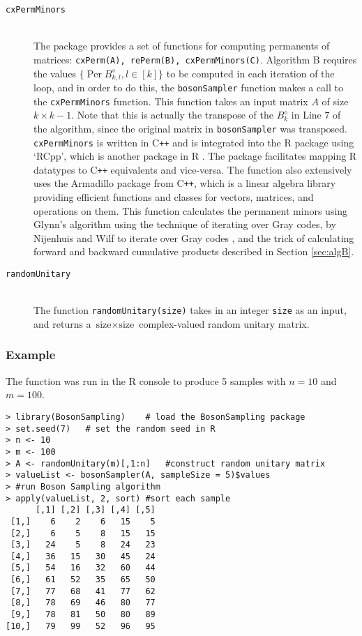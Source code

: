 \documentclass[11pt]{article}
\theoremstyle{theorem}
\theoremstyle{theorem}
\theoremstyle{remark}
\theoremstyle{note}
\theoremstyle{plain}
\theoremstyle{definition}
\DeclareMathOperator*{\Per}{\mathrm{Per}}
\begin{document}
\begin{description}
\item[\texttt{cxPermMinors}] \hfill \\ The package provides a set of functions for computing permanents of matrices: \texttt{cxPerm(A), rePerm(B), cxPermMinors(C)}. Algorithm B requires the values $\{ \Per B_{k, l}^{\diamond}, l \in [k] \}$ to be computed in each iteration of the loop, and in order to do this, the \texttt{bosonSampler} function makes a call to the \texttt{cxPermMinors} function. This function takes an input matrix $A$ of size $k \times k-1$. Note that this is actually the transpose of the $B_k^{\diamond}$ in Line 7 of the algorithm, since the original matrix in \texttt{bosonSampler} was transposed. \texttt{cxPermMinors} is written in C\texttt{++} and is integrated into the R package using `RCpp', which is another package in R \cite{rcpp}. The package facilitates  mapping R datatypes to C\texttt{++} equivalents and vice-versa. The function also extensively uses the Armadillo package from C\texttt{++}\cite{armadillo}, which is a linear algebra library providing efficient functions and classes for vectors, matrices, and operations on them. This function calculates the permanent minors using Glynn's algorithm \cite{glynn2010} using the technique of iterating over Gray codes, by Nijenhuis and Wilf\cite{Nijenhuis1978} to iterate over Gray codes , and the trick of calculating forward and backward cumulative products described in Section \ref{sec:algB}.
\item[\texttt{randomUnitary}] \hfill \\The function \texttt{randomUnitary(size)} takes in an integer \texttt{size} as an input, and returns a $\text{size} \times \text{size}$ complex-valued random unitary matrix.
\end{description}
\subsubsection*{Example}
The function was run in the R console to produce 5 samples with $n = 10$ and $m = 100$.
\begin{verbatim}
> library(BosonSampling)	# load the BosonSampling package
> set.seed(7)	# set the random seed in R
> n <- 10
> m <- 100
> A <- randomUnitary(m)[,1:n]	#construct random unitary matrix
> valueList <- bosonSampler(A, sampleSize = 5)$values
> #run Boson Sampling algorithm
> apply(valueList, 2, sort) #sort each sample
      [,1] [,2] [,3] [,4] [,5]
 [1,]    6    2    6   15    5
 [2,]    6    5    8   15   15
 [3,]   24    5    8   24   23
 [4,]   36   15   30   45   24
 [5,]   54   16   32   60   44
 [6,]   61   52   35   65   50
 [7,]   77   68   41   77   62
 [8,]   78   69   46   80   77
 [9,]   78   81   50   80   89
[10,]   79   99   52   96   95
\end{verbatim}
\end{document}
